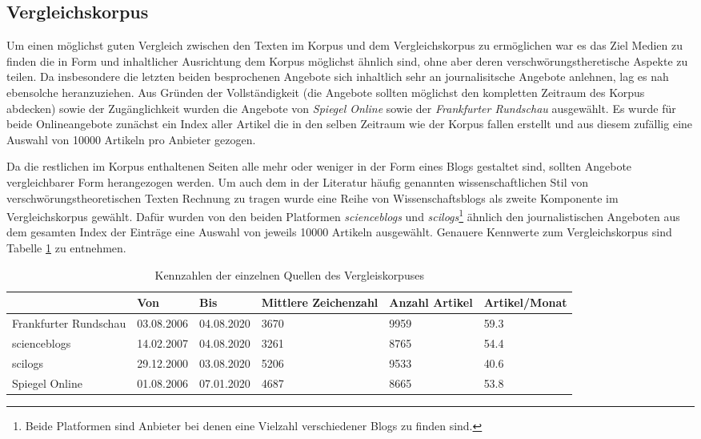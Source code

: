 \subsection{Vergleichskorpus}

Um einen möglichst guten Vergleich zwischen den Texten im Korpus und dem Vergleichskorpus zu ermöglichen war es das Ziel Medien zu finden die in Form und inhaltlicher Ausrichtung dem Korpus möglichst ähnlich sind, ohne aber deren verschwörungstheretische Aspekte zu teilen.
Da insbesondere die letzten beiden besprochenen Angebote sich inhaltlich sehr an journalisitsche Angebote anlehnen, lag es nah ebensolche heranzuziehen.
Aus Gründen der Vollständigkeit (die Angebote sollten möglichst den kompletten Zeitraum des Korpus abdecken) sowie der Zugänglichkeit wurden die Angebote von \textit{Spiegel Online} sowie der \textit{Frankfurter Rundschau} ausgewählt.
Es wurde für beide Onlineangebote zunächst ein Index aller Artikel die in den selben Zeitraum wie der Korpus fallen erstellt und aus diesem zufällig eine Auswahl von 10000 Artikeln pro Anbieter gezogen.

Da die restlichen im Korpus enthaltenen Seiten alle mehr oder weniger in der Form eines Blogs gestaltet sind, sollten Angebote vergleichbarer Form herangezogen werden.
Um auch dem in der Literatur häufig genannten wissenschaftlichen Stil von verschwörungstheoretischen Texten Rechnung zu tragen wurde eine Reihe von Wissenschaftsblogs als zweite Komponente im Vergleichskorpus gewählt.
Dafür wurden von den beiden Platformen \textit{scienceblogs} und \textit{scilogs}\footnote{Beide Platformen sind Anbieter bei denen eine Vielzahl verschiedener Blogs zu finden sind.} ähnlich den journalistischen Angeboten aus dem gesamten Index der Einträge eine Auswahl von jeweils 10000 Artikeln ausgewählt.
Genauere Kennwerte zum Vergleichskorpus sind Tabelle \ref{comcorpus-stats} zu entnehmen.

\begin{table}
    \begin{center}
        \begin{tabularx}{\textwidth}{XXXXXX}
            \toprule
            & Von & Bis & Mittlere Zeichenzahl & Anzahl Artikel & Artikel/Monat\\
            \midrule
            Frankfurter Rundschau & 03.08.2006 & 04.08.2020 & 3670 & 9959 & 59.3\\
            scienceblogs & 14.02.2007 & 04.08.2020 & 3261 & 8765 & 54.4\\
            scilogs & 29.12.2000 & 03.08.2020 & 5206 & 9533 & 40.6\\
            Spiegel Online & 01.08.2006 & 07.01.2020 & 4687 & 8665 & 53.8\\
            \bottomrule
        \end{tabularx}
        \caption{Kennzahlen der einzelnen Quellen des Vergleiskorpuses}
        \label{comcorpus-stats}
    \end{center}
\end{table}

